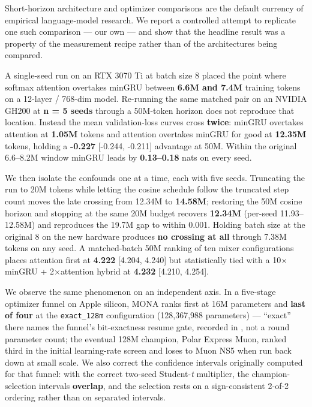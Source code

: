 Short-horizon architecture and optimizer comparisons are the default currency of empirical
language-model research. We report a controlled attempt to replicate one such comparison ---
our own --- and show that the headline result was a property of the measurement recipe rather
than of the architectures being compared.

A single-seed run on an RTX 3070 Ti at batch size 8 placed the point where softmax attention
overtakes minGRU between \textbf{6.6M and 7.4M} training tokens on a 12-layer / 768-dim model.
Re-running the same matched pair on an NVIDIA GH200 at \textbf{n = 5 seeds} through a 50M-token
horizon does not reproduce that location. Instead the mean validation-loss curves cross
\textbf{twice}: minGRU overtakes attention at \textbf{1.05M} tokens and attention overtakes minGRU for
good at \textbf{12.35M} tokens, holding a \textbf{-0.227} {[}-0.244, -0.211{]} advantage at 50M. Within the
original 6.6--8.2M window minGRU leads by \textbf{0.13--0.18} nats on every seed.

We then isolate the confounds one at a time, each with five seeds. Truncating the run to 20M
tokens while letting the cosine schedule follow the truncated step count moves the late crossing
from 12.34M to \textbf{14.58M}; restoring the 50M cosine horizon and stopping at the same 20M budget
recovers \textbf{12.34M} (per-seed 11.93--12.58M) and reproduces the 19.7M gap to within 0.001. Holding
batch size at the original 8 on the new hardware produces \textbf{no crossing at all} through 7.38M
tokens on any seed. A matched-batch 50M ranking of ten mixer configurations places attention
first at \textbf{4.222} {[}4.204, 4.240{]} but statistically tied with a 10$\times$minGRU + 2$\times$attention hybrid at
\textbf{4.232} {[}4.210, 4.254{]}.

We observe the same phenomenon on an independent axis. In a five-stage optimizer funnel on Apple
silicon, MONA ranks first at 16M parameters and \textbf{last of four} at the \texttt{exact\_128m} configuration (128,367,988 parameters) --- ``exact'' there names the funnel's bit-exactness resume gate, recorded in
, not a round parameter count;
the eventual 128M champion, Polar Express Muon, ranked third in the initial learning-rate screen
and loses to Muon NS5 when run back down at small scale. We also correct the confidence intervals
originally computed for that funnel: with the correct two-seed Student-\emph{t} multiplier, the
champion-selection intervals \textbf{overlap}, and the selection rests on a sign-consistent 2-of-2
ordering rather than on separated intervals.

